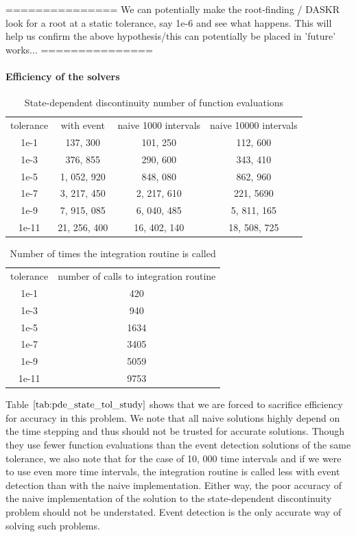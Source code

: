 \documentclass{article}
\begin{document}
===============
We can potentially make the root-finding / DASKR look for a root at a static tolerance, say 1e-6 and see what happens. This will help us confirm the above hypothesis/this can potentially be placed in 'future' works...
===============

\paragraph{Efficiency of the solvers}
\begin{table}[h]
\caption {State-dependent discontinuity number of function evaluations} 
\label{tab:pde_state_tol_study}
\begin{center}
\begin{tabular}{ c c c c } 
tolerance & with event & naive 1000 intervals & naive 10000 intervals\\ 
1e-1 & 137, 300 & 101, 250 & 112, 600 \\
1e-3 & 376, 855 & 290, 600 & 343, 410 \\
1e-5 & 1, 052, 920 & 848, 080 & 862, 960 \\
1e-7 & 3, 217, 450 & 2, 217, 610 & 221, 5690 \\
1e-9 & 7, 915, 085 & 6, 040, 485 & 5, 811, 165 \\
1e-11 & 21, 256, 400 & 16, 402, 140 & 18, 508, 725 \\
\end{tabular}
\end{center}
\end{table}

\begin{table}[h]
\caption {Number of times the integration routine is called} 
\label{tab:pde_state_tol_num_integrations}
\begin{center}
\begin{tabular}{ c c } 
tolerance & number of calls to integration routine \\ 
1e-1 & 420 \\
1e-3 & 940 \\
1e-5 & 1634 \\
1e-7 & 3405 \\
1e-9 & 5059 \\
1e-11 & 9753 \\
\end{tabular}
\end{center}
\end{table}

Table $\ref{tab:pde_state_tol_study}$ shows that we are forced to sacrifice efficiency for accuracy in this problem. We note that all naive solutions highly depend on the time stepping and thus should not be trusted for accurate solutions. Though they use fewer function evaluations than the event detection solutions of the same tolerance, we also note that for the case of 10, 000 time intervals and if we were to use even more time intervals, the integration routine is called less with event detection than with the naive implementation. Either way, the poor accuracy of the naive implementation of the solution to the state-dependent discontinuity problem should not be understated. Event detection is the only accurate way of solving such problems. 
\end{document}
